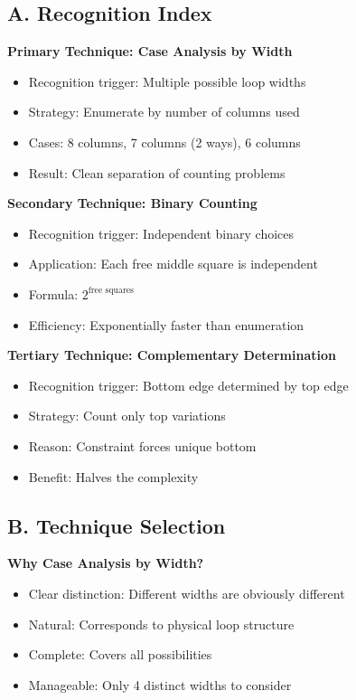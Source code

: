\documentclass[12pt]{article}
\begin{document}
\begin{techniquesbox}

\subsection*{A. Recognition Index}

\textbf{Primary Technique: Case Analysis by Width}
\begin{itemize}
    \item Recognition trigger: Multiple possible loop widths
    \item Strategy: Enumerate by number of columns used
    \item Cases: 8 columns, 7 columns (2 ways), 6 columns
    \item Result: Clean separation of counting problems
\end{itemize}

\textbf{Secondary Technique: Binary Counting}
\begin{itemize}
    \item Recognition trigger: Independent binary choices
    \item Application: Each free middle square is independent
    \item Formula: $2^{\text{free squares}}$
    \item Efficiency: Exponentially faster than enumeration
\end{itemize}

\textbf{Tertiary Technique: Complementary Determination}
\begin{itemize}
    \item Recognition trigger: Bottom edge determined by top edge
    \item Strategy: Count only top variations
    \item Reason: Constraint forces unique bottom
    \item Benefit: Halves the complexity
\end{itemize}

\subsection*{B. Technique Selection}

\textbf{Why Case Analysis by Width?}
\begin{itemize}
    \item Clear distinction: Different widths are obviously different
    \item Natural: Corresponds to physical loop structure
    \item Complete: Covers all possibilities
    \item Manageable: Only 4 distinct widths to consider
\end{itemize}


\end{techniquesbox}
\end{document}
